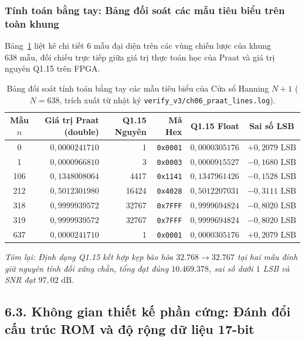 \subsubsection*{Tính toán bằng tay: Bảng đối soát các mẫu tiêu biểu trên toàn khung}
Bảng~\ref{tab:ch06_sample_check} liệt kê chi tiết 6 mẫu đại diện trên các vùng chiến lược của khung $638\text{ mẫu}$, đối chiếu trực tiếp giữa giá trị thực toán học của Praat và giá trị nguyên Q1.15 trên FPGA.

\begin{table}[H]
\centering
\caption{Bảng đối soát tính toán bằng tay các mẫu tiêu biểu của Cửa sổ Hanning $N+1$ ($N = 638$, trích xuất từ nhật ký \texttt{verify\_v3/ch06\_praat\_lines.log}).}
\label{tab:ch06_sample_check}
\footnotesize
\begin{tabular}{crrrrc}
\toprule
\textbf{Mẫu $n$} & \textbf{Giá trị Praat (double)} & \textbf{Q1.15 Nguyên} & \textbf{Mã Hex} & \textbf{Q1.15 Float} & \textbf{Sai số LSB} \\
\midrule
0   & $0{,}0000241710$ & 1      & \texttt{0x0001} & $0{,}0000305176$ & $+0{,}2079\text{ LSB}$ \\
1   & $0{,}0000966810$ & 3      & \texttt{0x0003} & $0{,}0000915527$ & $-0{,}1680\text{ LSB}$ \\
106 & $0{,}1348008064$ & 4417   & \texttt{0x1141} & $0{,}1347961426$ & $-0{,}1528\text{ LSB}$ \\
212 & $0{,}5012301980$ & 16424  & \texttt{0x4028} & $0{,}5012207031$ & $-0{,}3111\text{ LSB}$ \\
318 & $0{,}9999939572$ & 32767  & \texttt{0x7FFF} & $0{,}9999694824$ & $-0{,}8020\text{ LSB}$ \\
319 & $0{,}9999939572$ & 32767  & \texttt{0x7FFF} & $0{,}9999694824$ & $-0{,}8020\text{ LSB}$ \\
637 & $0{,}0000241710$ & 1      & \texttt{0x0001} & $0{,}0000305176$ & $+0{,}2079\text{ LSB}$ \\
\bottomrule
\end{tabular}
\end{table}

\textit{Tóm lại: Định dạng Q1.15 kết hợp kẹp bão hòa $32.768 \to 32.767$ tại hai mẫu đỉnh giữ nguyên tính đối xứng chẵn, tổng đạt đúng $10.469.378$, sai số dưới $1$ LSB và SNR đạt $97{,}02\text{ dB}$.}


\subsection*{6.3. Không gian thiết kế phần cứng: Đánh đổi cấu trúc ROM và độ rộng dữ liệu 17-bit}

